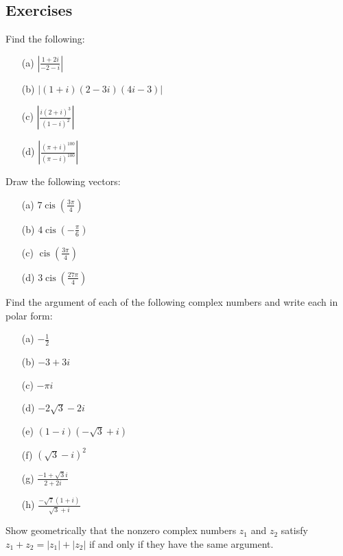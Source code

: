 \documentclass[
	12pt, %
	fleqn, %
	a4paper, %
]{LegrandOrangeBook}
\begin{document}
\subsection{Exercises}
\begin{exercise}
    Find the following:
    \begin{enumerate}
        \item[(a)] \( \left| \frac{1 + 2i}{-2 - i} \right| \)
        \item[(b)] \( \left| (1 + i)(2 - 3i)(4i - 3) \right| \)
        \item[(c)] \( \left| \frac{i(2 + i)^3}{(1 - i)^2} \right| \)
        \item[(d)] \( \left| \frac{(\pi + i)^{100}}{(\pi - i)^{100}} \right| \)
    \end{enumerate}
\end{exercise}
\begin{exercise}
    Draw the following vectors:
    \begin{enumerate}
        \item[(a)] \( 7 \operatorname{cis}\left(\frac{3\pi}{4}\right) \)
        \item[(b)] \( 4 \operatorname{cis}\left(-\frac{\pi}{6}\right) \)
        \item[(c)] \( \operatorname{cis}\left(\frac{3\pi}{4}\right) \)
        \item[(d)] \( 3 \operatorname{cis}\left(\frac{27\pi}{4}\right) \)
    \end{enumerate}
\end{exercise}
\begin{exercise}
    Find the argument of each of the following complex numbers and write each in polar form:
    \begin{enumerate}
        \item[(a)] \( -\frac{1}{2} \)
        \item[(b)] \( -3 + 3i \)
        \item[(c)] \( -\pi i \)
        \item[(d)] \( -2\sqrt{3} - 2i \)
        \item[(e)] \( (1 - i)(-\sqrt{3} + i) \)
        \item[(f)] \( (\sqrt{3} - i)^2 \)
        \item[(g)] \( \frac{-1 + \sqrt{3}i}{2 + 2i} \)
        \item[(h)] \( \frac{-\sqrt{7}(1 + i)}{\sqrt{3} + i} \)
    \end{enumerate}
\end{exercise}
\begin{exercise}
    Show geometrically that the nonzero complex numbers \( z_1 \) and \( z_2 \) satisfy \( z_1 + z_2 = |z_1| + |z_2| \) if and only if they have the same argument.
\end{exercise}
\end{document}
